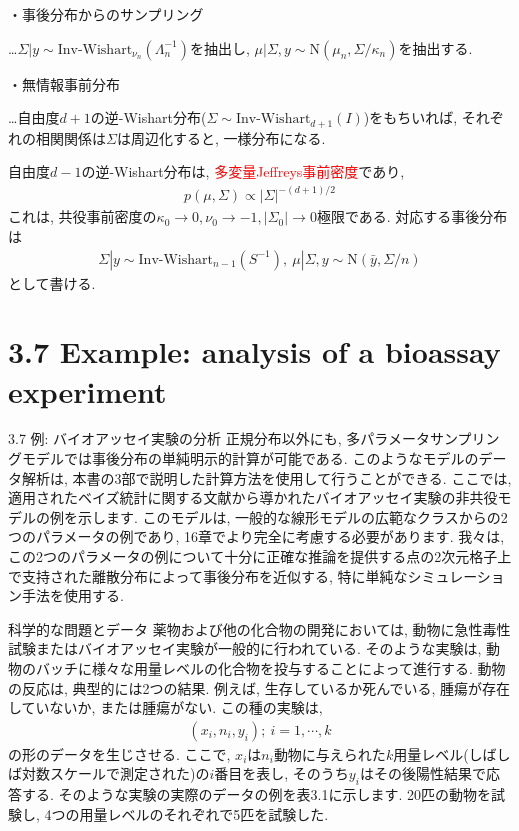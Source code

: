 \documentclass[10pt,dvipdfmx,a4]{beamer}
\newcommand{\eqn}[1]{\begin{align*}#1\end{align*}}
\newcommand{\tcr}[1]{\textcolor{red}{#1}}
\begin{document}

\begin{frame}
・事後分布からのサンプリング

…$\Sigma|y\sim \text{Inv-Wishart}_{\nu_n}(\Lambda^{- 1}_n)$を抽出し, $\mu|\Sigma,y\sim \text{N}(\mu_n, \Sigma/\kappa_n)$を抽出する.

・無情報事前分布

…自由度$d+1$の逆-Wishart分布($\Sigma\sim\text{Inv-Wishart}_{d+1}(I)$)をもちいれば, それぞれの相関関係は$\Sigma$は周辺化すると, 一様分布になる.

自由度$d-1$の逆-Wishart分布は, \tcr{多変量Jeffreys事前密度}であり,
\eqn{p(\mu,\Sigma)\propto|\Sigma|^{-(d+1)/2}}
これは, 共役事前密度の$\kappa_0\rightarrow 0, \nu_0\rightarrow -1, |\Sigma_0|\rightarrow 0$極限である.
対応する事後分布は
\eqn{\Sigma|y\sim \text{Inv-Wishart}_{n-1}(S^{-1}),\ \mu|\Sigma, y\sim \text{N}(\bar{y},\Sigma/n)}
として書ける.
\end{frame}

\section{3.7 Example: analysis of a bioassay experiment}
\begin{frame}{3.7 例: バイオアッセイ実験の分析}
正規分布以外にも, 多パラメータサンプリングモデルでは事後分布の単純明示的計算が可能である.
このようなモデルのデータ解析は, 本書の3部で説明した計算方法を使用して行うことができる.
ここでは, 適用されたベイズ統計に関する文献から導かれたバイオアッセイ実験の非共役モデルの例を示します.
このモデルは, 一般的な線形モデルの広範なクラスからの2つのパラメータの例であり, 16章でより完全に考慮する必要があります.
我々は, この2つのパラメータの例について十分に正確な推論を提供する点の2次元格子上で支持された離散分布によって事後分布を近似する, 特に単純なシミュレーション手法を使用する.
\end{frame}


\begin{frame}{科学的な問題とデータ}
薬物および他の化合物の開発においては, 動物に急性毒性試験またはバイオアッセイ実験が一般的に行われている.
そのような実験は, 動物のバッチに様々な用量レベルの化合物を投与することによって進行する.
動物の反応は, 典型的には2つの結果.
例えば, 生存しているか死んでいる, 腫瘍が存在していないか, または腫瘍がない.
この種の実験は,
\eqn{(x_i,n_i,y_i);\ i=1,\cdots,k}
の形のデータを生じさせる.
ここで, $x_i$は$n_i$動物に与えられた$k$用量レベル(しばしば対数スケールで測定された)の$i$番目を表し, そのうち$y_i$はその後陽性結果で応答する.
そのような実験の実際のデータの例を表3.1に示します.
20匹の動物を試験し, 4つの用量レベルのそれぞれで5匹を試験した.
\end{frame}
\end{document}
